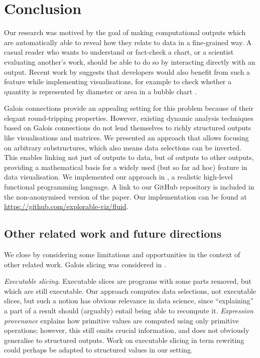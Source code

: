 \section{Conclusion}
\label{sec:conclusion}

Our research was motived by the goal of making computational outputs which are automatically able to reveal how they relate to data in a fine-grained way. A casual reader who wants to understand or fact-check a chart, or a scientist evaluating another's work, should be able to do so by interacting directly with an output. Recent work by \citeauthor{walny19} suggests that developers would also benefit from such a feature while implementing visualisations, for example to check whether a quantity is represented by diameter or area in a bubble chart \cite{walny19}.

Galois connections provide an appealing setting for this problem because of their elegant round-tripping properties. However,  existing dynamic analysis techniques based on Galois connections do not lend themselves to richly structured outputs like visualisations and matrices. We presented an approach that allows focusing on arbitrary substructures, which also means data selections can be inverted. This enables linking not just of outputs to data, but of outputs to other outputs, providing a mathematical basis for a widely used (but so far ad hoc) feature in data visualisation. We implemented our approach in \OurLanguage, a realistic high-level functional programming language. %
\ifanonymous%
   A link to our GitHub repository is included in the non-anonymised version of the paper.
\else%
   Our implementation can be found at \url{https://github.com/explorable-viz/fluid}.%
\fi%

\subsection{Other related work and future directions}
\label{sec:conclusion:other-related-work}

We close by considering some limitations and opportunities in the context of other related work. Galois slicing \cite{perera12a,ricciotti17,perera16d} was considered in .

\emph{Executable slicing.} Executable slices \cite{hall95} are programs with some parts removed, but which are still executable. Our approach computes data selections, not executable slices, but such a notion has obvious relevance in data science, since ``explaining'' a part of a result should (arguably) entail being able to recompute it. \emph{Expression provenance} \cite{acar12} explains how primitive values are computed using only primitive operations; however, this still omits crucial information, and does not obviously generalise to structured outputs. Work on executable slicing in term rewriting \cite{field98} could perhaps be adapted to structured values in our setting.


